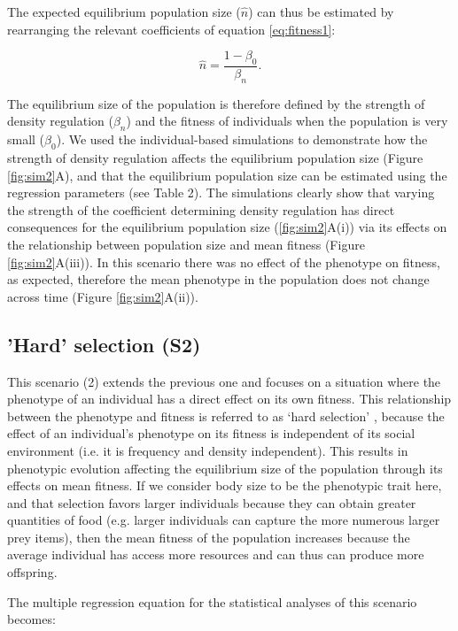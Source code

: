 \documentclass{article}
\begin{document}
The expected equilibrium population size ($\hat{n}$) can thus be estimated by rearranging the relevant coefficients of equation \ref{eq:fitness1}:

\begin{equation}\label{eq:equilibrium}
\hat{n}=\frac{1-\beta_{0}}{\beta_n}. 
\end{equation} 

\noindent The equilibrium size of the population is therefore defined by the strength of density regulation ($\beta_n$) and the fitness of individuals when the population is very small ($\beta_0$). We used the individual-based simulations to demonstrate how the strength of density regulation affects the equilibrium population size (Figure \ref{fig:sim2}A), and that the equilibrium population size can be estimated using the regression parameters (see Table 2). The simulations clearly show that varying the strength of the coefficient determining density regulation has direct consequences for the equilibrium population size (\ref{fig:sim2}A(i)) via its effects on the relationship between population size and mean fitness (Figure \ref{fig:sim2}A(iii)). In this scenario there was no effect of the phenotype on fitness, as expected, therefore the mean phenotype in the population does not change across time (Figure \ref{fig:sim2}A(ii)). 

\subsection{'Hard' selection (S2)}
This scenario (2) extends the previous one and focuses on a situation where the phenotype of an individual has a direct effect on its own fitness. This relationship between the phenotype and fitness is referred to as `hard selection' \citep{Wallace1975, Bell2021}, because the effect of an individual's phenotype on its fitness is independent of its social environment (i.e. it is frequency and density independent). This results in phenotypic evolution affecting the equilibrium size of the population through its effects on mean fitness. If we consider body size to be the phenotypic trait here, and that selection favors larger individuals because they can obtain greater quantities of food (e.g. larger individuals can capture the more numerous larger prey items), then the mean fitness of the population increases because the average individual has access more resources and can thus can produce more offspring. 

The multiple regression equation for the statistical analyses of this scenario becomes:
\end{document}
